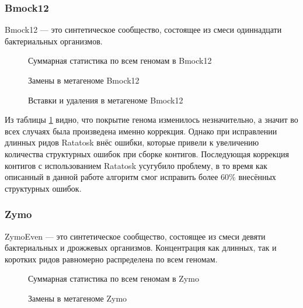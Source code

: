 \documentclass[14pt]{matmex-diploma-custom}
\begin{document}
\subsubsection*{Bmock12}
Bmock12 --- это синтетическое сообщество, состоящее из смеси одиннадцати бактериальных организмов. 

\begin{figure}[h!]
    
    \caption{Суммарная статистика по всем геномам в Bmock12}
    \label{fig:general_bmock12}
\end{figure}

\begin{figure}[h!]
    
    \caption{Замены в метагеноме Bmock12}
    \label{fig:mismatches_bmock12}
\end{figure}

\begin{figure}[h!]
    
    \caption{Вставки и удаления в метагеноме Bmock12}
    \label{fig:indels_bmock12}
\end{figure}

Из таблицы \ref{fig:general_bmock12} видно, что покрытие генома изменилось незначительно, а значит во всех случаях была произведена именно коррекция. Однако при исправлении длинных ридов Ratatosk внёс ошибки, которые привели к увеличению количества структурных ошибок при сборке контигов. Последующая коррекция контигов с использованием Ratatosk усугубило проблему, в то время как описанный в данной работе алгоритм смог исправить более $60\%$ внесённых структурных ошибок.

\subsubsection*{Zymo}
ZymoEven --- это синтетическое сообщество, состоящее из смеси  девяти бактериальных и дрожжевых организмов. Концентрация как длинных, так и коротких ридов равномерно распределена по всем геномам.

\begin{figure}[h!]
    
    \caption{Суммарная статистика по всем геномам в Zymo}
    \label{fig:general_zymo}
\end{figure}

\begin{figure}[h!]
    
    \caption{Замены в метагеноме Zymo}
    \label{fig:mismatches_zymo}
\end{figure}
\end{document}
